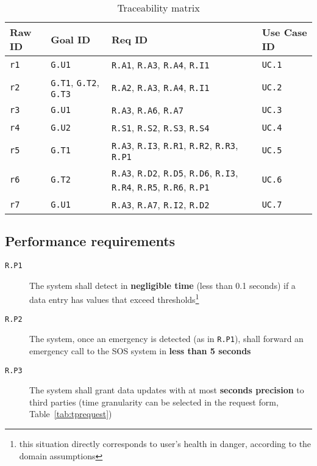     \begin{table}[h!]
      \centering
      \begin{tabularx}{.8\linewidth}{|X|X|X|X|}
        \hline
        \textbf{Raw ID} & \textbf{Goal ID} & \textbf{Req ID} & \textbf{Use Case ID} \\ \hline
        \texttt{r1} & \texttt{G.U1} & \texttt{R.A1}, \texttt{R.A3}, \texttt{R.A4}, \texttt{R.I1} & \texttt{UC.1} \\
        \hline
        \texttt{r2} & \texttt{G.T1}, \texttt{G.T2}, \texttt{G.T3} & \texttt{R.A2}, \texttt{R.A3}, \texttt{R.A4}, \texttt{R.I1} & \texttt{UC.2} \\
        \hline
        \texttt{r3} & \texttt{G.U1} & \texttt{R.A3}, \texttt{R.A6}, \texttt{R.A7} & \texttt{UC.3} \\
        \hline
        \texttt{r4} & \texttt{G.U2} & \texttt{R.S1},  \texttt{R.S2}, \texttt{R.S3}, \texttt{R.S4} & \texttt{UC.4} \\
        \hline
        \texttt{r5} & \texttt{G.T1} & \texttt{R.A3}, \texttt{R.I3}, \texttt{R.R1}, \texttt{R.R2}, \texttt{R.R3}, \texttt{R.P1} & \texttt{UC.5}  \\
        \hline
        \texttt{r6} & \texttt{G.T2} & \texttt{R.A3},  \texttt{R.D2}, \texttt{R.D5}, \texttt{R.D6}, \texttt{R.I3}, \texttt{R.R4}, \texttt{R.R5}, \texttt{R.R6}, \texttt{R.P1} & \texttt{UC.6}   \\
        \hline
        \texttt{r7} & \texttt{G.U1} & \texttt{R.A3}, \texttt{R.A7},  \texttt{R.I2},  \texttt{R.D2} & \texttt{UC.7}   \\
        \hline
      \end{tabularx}
      \caption{Traceability matrix}
      \label{tab:tracmatrix}
    \end{table}

  \clearpage
  \subsection{Performance requirements}
  \label{sec:performance}

    \begin{description}
      \item[\texttt{R.P1}] The system shall detect in \textbf{negligible time} (less than 0.1 seconds) if a data entry has values that exceed thresholds\footnote{this situation directly corresponds to user's health in danger, according to the domain assumptions}
      \item[\texttt{R.P2}] The system, once an emergency is detected (as in \texttt{R.P1}), shall forward an emergency call to the SOS system in \textbf{less than 5 seconds}
      \item[\texttt{R.P3}] The system shall grant data updates with at most \textbf{seconds precision} to third parties (time granularity can be selected in the request form, Table~\ref{tab:tprequest})
    \end{description}

